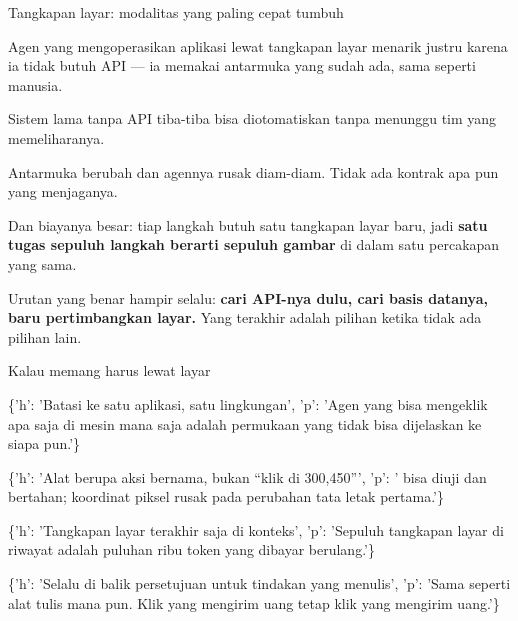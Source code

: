 \documentclass[aspectratio=169,11pt,t]{beamer}
\begin{document}
\begin{frame}[shrink=25]{Tangkapan layar: modalitas yang paling cepat tumbuh}
{\fontsize{9.4}{12.6}\selectfont\color{fg2}Agen yang mengoperasikan aplikasi lewat tangkapan layar menarik justru karena ia tidak butuh API --- ia memakai antarmuka yang sudah ada, sama seperti manusia.\par}\vskip 4pt
\begin{minipage}[t]{0.494\textwidth}
\begin{icard}
Sistem lama tanpa API tiba-tiba bisa diotomatiskan tanpa menunggu tim yang memeliharanya.
\end{icard}
\end{minipage}%
\hfill
\begin{minipage}[t]{0.494\textwidth}
\begin{icardbad}
Antarmuka berubah dan agennya rusak diam-diam. Tidak ada kontrak apa pun yang menjaganya.
\end{icardbad}
\end{minipage}%
{\fontsize{9.4}{12.6}\selectfont\color{fg2}Dan biayanya besar: tiap langkah butuh satu tangkapan layar baru, jadi \textbf{satu tugas sepuluh langkah berarti sepuluh gambar} di dalam satu percakapan yang sama.\par}\vskip 4pt
\begin{iband}[signal]
Urutan yang benar hampir selalu: \textbf{cari API-nya dulu, cari basis datanya, baru pertimbangkan layar.} Yang terakhir adalah pilihan ketika tidak ada pilihan lain.
\end{iband}
\end{frame}

\begin{frame}[shrink=25]{Kalau memang harus lewat layar}
\begin{isteps}
\item \{'h': 'Batasi ke satu aplikasi, satu lingkungan', 'p': 'Agen yang bisa mengeklik apa saja di mesin mana saja adalah permukaan yang tidak bisa dijelaskan ke siapa pun.'\}
\item \{'h': 'Alat berupa aksi bernama, bukan ``klik di 300,450''', 'p': ' bisa diuji dan bertahan; koordinat piksel rusak pada perubahan tata letak pertama.'\}
\item \{'h': 'Tangkapan layar terakhir saja di konteks', 'p': 'Sepuluh tangkapan layar di riwayat adalah puluhan ribu token yang dibayar berulang.'\}
\item \{'h': 'Selalu di balik persetujuan untuk tindakan yang menulis', 'p': 'Sama seperti alat tulis mana pun. Klik yang mengirim uang tetap klik yang mengirim uang.'\}
\end{isteps}
\end{frame}
\end{document}

